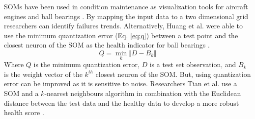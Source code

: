 SOMs have been used in condition maintenance as visualization tools for aircraft engines and ball bearings \cite{come2010aircraft}.
By mapping the input data to a two dimensional grid researchers can identify failures trends.
Alternatively, Huang et al. were able to use the minimum quantization error (Eq. \ref{eq:q}) between a test point and the closest neuron of the SOM as the health indicator for ball bearings \cite{som-1}.
\begin{equation}\label{eq:q}
	Q = \min_{k} \Vert D-B_k \Vert
\end{equation}
Where $Q$ is the minimum quantization error, $D$ is a test set observation, and $B_k$ is the weight vector of the $k^{th}$ closest neuron of the SOM.
But, using quantization error can be improved as it is sensitive to noise.
Researchers Tian et al. use a SOM and a $k$-nearest neighbours algorithm in combination with the Euclidean distance between the test data and the healthy data to develop a more robust health score \cite{Tian2014AnomalyDU}.

